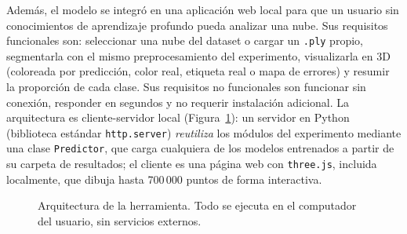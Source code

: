 \documentclass[5p]{elsarticle}
\begin{document}
Además, el modelo se integró en una aplicación web local para que un usuario sin conocimientos de aprendizaje profundo pueda analizar una nube. Sus requisitos funcionales son: seleccionar una nube del dataset o cargar un \texttt{.ply} propio, segmentarla con el mismo preprocesamiento del experimento, visualizarla en 3D (coloreada por predicción, color real, etiqueta real o mapa de errores) y resumir la proporción de cada clase. Sus requisitos no funcionales son funcionar sin conexión, responder en segundos y no requerir instalación adicional. La arquitectura es cliente-servidor local (Figura~\ref{fig:arqsw}): un servidor en Python (biblioteca estándar \texttt{http.server}) \emph{reutiliza} los módulos del experimento mediante una clase \texttt{Predictor}, que carga cualquiera de los modelos entrenados a partir de su carpeta de resultados; el cliente es una página web con \texttt{three.js}, incluida localmente, que dibuja hasta 700\,000 puntos de forma interactiva.

\begin{figure}[t]
\centering
{}
\caption{Arquitectura de la herramienta. Todo se ejecuta en el computador del usuario, sin servicios externos.}\label{fig:arqsw}
\end{figure}
\end{document}
